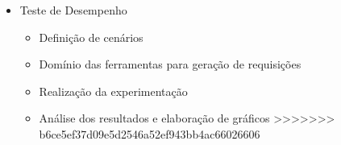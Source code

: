 \documentclass[a4paper, 11pt]{article}
\begin{document}
\begin{itemize}
 \item Teste de Desempenho 
  \begin{itemize}
    \item Definição de cenários
	\item Domínio das ferramentas para geração de requisições
	\item Realização da experimentação
	\item Análise dos resultados e elaboração de gráficos
>>>>>>> b6ce5ef37d09e5d2546a52ef943bb4ac66026606
  \end{itemize}
\end{itemize}




\end{document}
